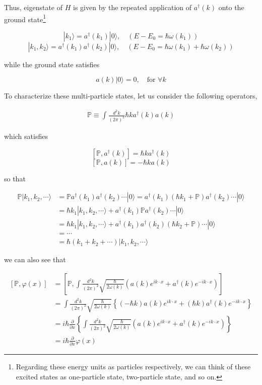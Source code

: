 Thus, eigenstate of $H$ is given by the repeated application of $a^\dagger(k)$ onto the ground state\footnote{Regarding these energy units as particles respectively, we can think of these excited states as one-particle state, two-particle state, and so on. }

\[|k_1\rangle = a^\dagger(k_1)|0\rangle,\quad (E-E_0=\hbar\omega(k_1)) \]
\[|k_1,k_2\rangle = a^\dagger(k_1)a^\dagger(k_2)|0\rangle,\quad (E-E_0=\hbar\omega(k_1)+\hbar\omega(k_2)) \]

while the ground state satisfies

\[a(k)|0\rangle = 0,\quad\text{for }\forall k \]

To characterize these multi-particle states, let us consider the following operators, 

\begin{align}
\mathbb{P} \equiv\int\frac{d^2 k}{(2\pi)^2}\hbar{k}a^\dagger({k})a({k})
\end{align}

which satisfies

\[[\mathbb{P},a^\dagger({k})] = \hbar {k}a^\dagger(k) \]
\[[\mathbb{P},a(k)] = -\hbar ka(k) \]

so that

\[\begin{split}
\mathbb{P}|k_1,k_2,\cdots\rangle &= \mathbb{P}a^\dagger(k_1)a^\dagger(k_2)\cdots|0\rangle  = a^\dagger(k_1)(\hbar k_1+\mathbb{P})a^\dagger(k_2)\cdots|0\rangle\\
&= \hbar k_1 |k_1,k_2,\cdots\rangle + a^\dagger(k_1)\mathbb{P}a^\dagger(k_2)\cdots|0\rangle\\
&= \hbar k_1|k_1,k_2,\cdots\rangle + a^\dagger(k_1)a^\dagger(k_2)(\hbar k_2+\mathbb{P})\cdots|0\rangle\\
&=\cdots\\
&=\hbar(k_1+k_2+\cdots)|k_1,k_2,\cdots\rangle
\end{split}\]

we can also see that

\[\begin{split}
[\mathbb{P},\varphi(x)] &= \left[\mathbb{P},\int\frac{d^2k}{(2\pi)^2}\sqrt{\frac{\hbar}{2\omega(k)}}\left(a(k)e^{ik\cdot x}+a^\dagger(k)e^{-ik\cdot x}\right)\right]\\
&= \int\frac{d^2 k}{(2\pi)^2}\sqrt{\frac{\hbar}{2\omega(k)}}\left\{(-\hbar k)a(k)e^{ik\cdot x}+(\hbar k)a^\dagger(k)e^{-ik\cdot x}\right\}\\
&= i\hbar\frac{\partial}{\partial x}\left\{\int\frac{d^2 k}{(2\pi)^2}\sqrt{\frac{\hbar}{2\omega(k)}}\left(a(k)e^{ik\cdot x}+a^\dagger(k)e^{-ik\cdot x}\right)\right\}\\
&=i\hbar\frac{\partial}{\partial x}\varphi(x)
\end{split}\]

